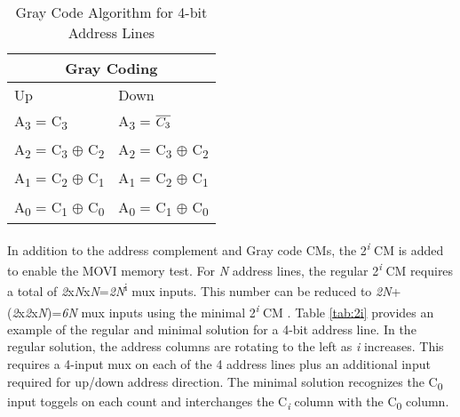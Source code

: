 \begin{table}[H]
  \centering
  \caption[Gray Code CM Algorithm]{Gray Code Algorithm for 4-bit Address Lines}
  \begin{tabular}{|l|l|}
    \hline
    \multicolumn{2}{|c|}{Gray Coding} \\
    \hline  
    Up & Down \\
    \hline
    A\textsubscript{3} = C\textsubscript{3}                           & A\textsubscript{3} = $\overline{C\textsubscript{3}}$              \\ %
    A\textsubscript{2} = C\textsubscript{3} $\oplus$ C\textsubscript{2} & A\textsubscript{2} = C\textsubscript{3} $\oplus$ C\textsubscript{2} \\ %
    A\textsubscript{1} = C\textsubscript{2} $\oplus$ C\textsubscript{1} & A\textsubscript{1} = C\textsubscript{2} $\oplus$ C\textsubscript{1} \\ %
    A\textsubscript{0} = C\textsubscript{1} $\oplus$ C\textsubscript{0} & A\textsubscript{0} = C\textsubscript{1} $\oplus$ C\textsubscript{0} \\ %
    \hline  
  \end{tabular}
  \label{tab:gc}
\end{table} 

In addition to the address complement and Gray code CMs, the 2\textsuperscript{\textit{i}} CM is added to enable the MOVI memory test.  For \textit{N} address lines, the regular 2\textsuperscript{\textit{i}} CM requires a total of \textit{2}x\textit{N}x\textit{N}=\textit{2N}\textsuperscript{i} mux inputs.  This number can be reduced to \textit{2N}+(\textit{2}x\textit{2}x\textit{N})=\textit{6N} mux inputs using the minimal 2\textsuperscript{\textit{i}} CM \cite{5941430}.  Table \ref{tab:2i} provides an example of the regular and minimal solution for a 4-bit address line.  In the regular solution, the address columns are rotating to the left as \textit{i} increases.  This requires a 4-input mux on each of the 4 address lines plus an additional input required for up/down address direction.  The minimal solution recognizes the C\textsubscript{0} input toggels on each count and interchanges the C\textsubscript{\textit{i}} column with the C{\textsubscript{0}} column.  

